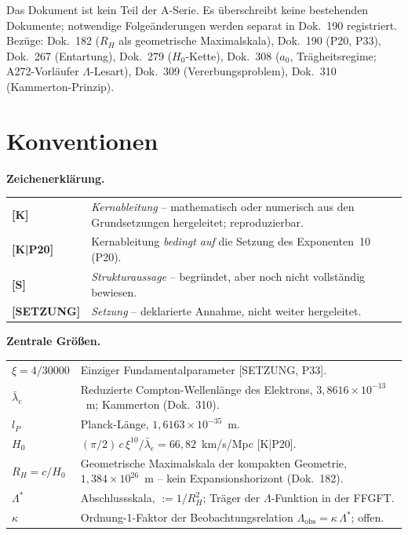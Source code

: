 \documentclass[11pt]{report}
\begin{document}
Das Dokument ist kein Teil der A-Serie. Es überschreibt keine
bestehenden Dokumente; notwendige Folgeänderungen werden separat
in Dok.~190 registriert.
Bezüge: Dok.~182 ($R_H$ als geometrische Maximalskala),
Dok.~190 (P20, P33), Dok.~267 (Entartung), Dok.~279 ($H_0$-Kette),
Dok.~308 ($a_0$, Trägheitsregime; A272-Vorläufer $\Lambda$-Lesart),
Dok.~309 (Vererbungsproblem), Dok.~310 (Kammerton-Prinzip).

\section*{Konventionen}

\noindent\textbf{Zeichenerklärung.}

\medskip
\begin{tabular}{@{}lp{11cm}}
\textbf{[K]}       & \emph{Kernableitung} -- mathematisch oder numerisch
                     aus den Grundsetzungen hergeleitet; reproduzierbar. \\[4pt]
\textbf{[K|P20]} & Kernableitung \emph{bedingt auf} die Setzung
                     des Exponenten~10 (P20). \\[4pt]
\textbf{[S]}       & \emph{Strukturaussage} -- begründet, aber noch nicht
                     vollständig bewiesen. \\[4pt]
\textbf{[SETZUNG]} & \emph{Setzung} -- deklarierte Annahme, nicht weiter
                     hergeleitet. \\
\end{tabular}

\medskip
\noindent\textbf{Zentrale Größen.}

\medskip
\begin{tabular}{@{}lp{10.5cm}}
$\xi = 4/30000$ & Einziger Fundamentalparameter [SETZUNG, P33]. \\[4pt]
$\bar\lambda_e$ & Reduzierte Compton-Wellenlänge des Elektrons,
                  $3{,}8616\times10^{-13}$~m; Kammerton (Dok.~310). \\[4pt]
$l_P$           & Planck-Länge, $1{,}6163\times10^{-35}$~m. \\[4pt]
$H_0$           & $(\pi/2)\,c\,\xi^{10}/\bar\lambda_e
                   = 66{,}82$~km/s/Mpc [K|P20]. \\[4pt]
$R_H = c/H_0$   & Geometrische Maximalskala der kompakten Geometrie,
                  $1{,}384\times10^{26}$~m -- kein Expansionshorizont
                  (Dok.~182). \\[4pt]
$\Lambda^{*}$   & Abschlussskala, $:= 1/R_H^2$; Träger der
                  $\Lambda$-Funktion in der FFGFT. \\[4pt]
$\kappa$        & Ordnung-1-Faktor der Beobachtungsrelation
                  $\Lambda_\text{obs} = \kappa\,\Lambda^{*}$; offen. \\
\end{tabular}
\end{document}
